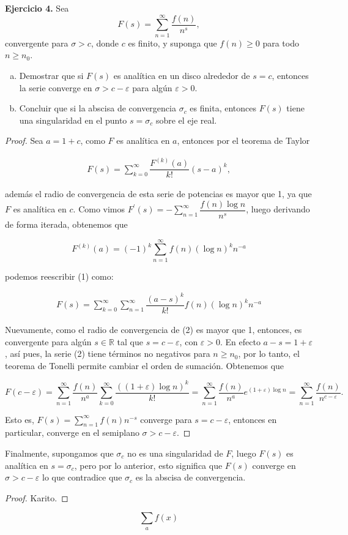 \documentclass[12pt, a4paper]{article}
\begin{document}
\textbf{Ejercicio 4.} Sea
\[
	F(s)=\sum_{n=1}^{\infty} \frac{f(n)}{n^{s}},
\]
convergente para $\sigma>c$, donde $c$ es finito, y suponga que $f(n)\ge 0$ para todo $n\ge n_0$.

\begin{enumerate}[(a)]
	\item Demostrar que si $F(s)$ es analítica en un disco alrededor de $s=c$, entonces la serie converge en $\sigma>c-\varepsilon$ para algún $\varepsilon>0$.

	\item Concluir que si la abscisa de convergencia $\sigma_c$ es finita, entonces $F(s)$ tiene una singularidad en el punto $s=\sigma_c$ sobre el eje real.
\end{enumerate}

\begin{proof}
	Sea $a=1+c$, como $F$ es analítica en $a$, entonces por el teorema de Taylor

	\begin{align}
		F(s)=\sum_{k=0}^\infty\dfrac{F^{(k)}(a)}{k!}(s-a)^k,
	\end{align}

	además el radio de convergencia de esta serie de potencias es mayor que 1, ya que $F$ es analítica en $c$. Como vimos $\displaystyle F^\prime(s)=-\sum_{n=1}^\infty\dfrac{f(n)\log n}{n^s}$, luego derivando de forma iterada, obtenemos que

	$$F^{(k)}(a)=(-1)^k \sum_{n=1}^{\infty}f(n)(\log n)^kn^{-a}$$

	podemos reescribir (1) como:

	\begin{align}
		F(s)=\sum_{k=0}^{\infty}\sum_{n=1}^\infty\dfrac{(a-s)^k}{k!}f(n)(\log n)^k n^{-a}
	\end{align}

	Nuevamente, como el radio de convergencia de (2) es mayor que 1, entonces, es convergente para algún $s\in \mathbb{R}$ tal que $s=c-\varepsilon$, con $\varepsilon>0$. En efecto $a-s=1+\varepsilon$, así pues, la serie (2) tiene términos no negativos para $n\geq n_0$, por lo tanto, el teorema de Tonelli permite cambiar el orden de sumación. Obtenemos que

	$$F(c-\varepsilon)=\sum_{n=1}^\infty\dfrac{f(n)}{n^a}\sum_{k=0}^\infty\dfrac{((1+\varepsilon)\log n)^k}{k!}=\sum_{n=1}^\infty\dfrac{f(n)}{n^a}e^{(1+\varepsilon)\log n}=\sum_{n=1}^\infty \dfrac{f(n)}{n^{c-\varepsilon}}.$$

	Esto es, $F(s)=\displaystyle\sum_{n=1}^\infty f(n)n^{-s}$ converge para $s=c-\varepsilon$, entonces en particular, converge en el semiplano $\sigma>c-\varepsilon$.
\end{proof}

Finalmente, supongamos que $\sigma_c$ no es una singularidad de $F$, luego $F(s)$ es analítica en $s=\sigma_c$, pero por lo anterior, esto significa que $F(s)$ converge en $\sigma>c-\varepsilon$ lo que contradice que $\sigma_c$ es la abscisa de convergencia.

\begin{proof}
	Karito.
\end{proof}

$$\sum_af(x)$$
\end{document}

